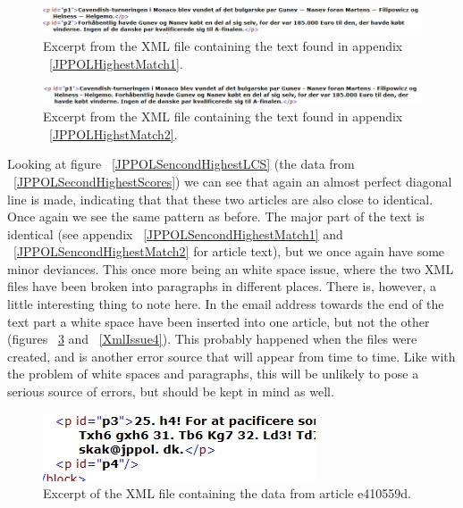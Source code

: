 \begin{figure}
 	\centering
 	\includegraphics[scale=0.5]{figures/XmlIssue1}
 	\caption{Excerpt from the XML file containing the text found in appendix ~\ref{JPPOLHighestMatch1}.}
 	\label{XmlIssue1}
\end{figure}

\begin{figure}
	\centering
	\includegraphics[scale=0.5]{figures/XmlIssue2}
	\caption{Excerpt from the XML file containing the text found in appendix ~\ref{JPPOLHighstMatch2}.}
	\label{XmlIssue2}
\end{figure}

Looking at figure ~\ref{JPPOLSencondHighestLCS} (the data from ~\ref{JPPOLSecondHighestScores}) we can see that again an almost perfect diagonal line is made, indicating that that these two articles are also close to identical. Once again we see the same pattern as before. The major part of the text is identical (see appendix ~\ref{JPPOLSencondHighestMatch1} and ~\ref{JPPOLSencondHighestMatch2} for article text), but we once again have some minor deviances. This once more being an white space issue, where the two XML files have been broken into paragraphs in different places. There is, however, a little interesting thing to note here. In the email address towards the end of the text part a white space have been inserted into one article, but not the other (figures ~\ref{XmlIssue3} and ~\ref{XmlIssue4}). This probably happened when the files were created, and is another error source that will appear from time to time. Like with the problem of white spaces and paragraphs, this will be unlikely to pose a serious source of errors, but should be kept in mind as well.

\begin{figure}
	\centering
	\includegraphics[scale=1.0]{figures/XmlIssue3}
	\caption{Excerpt of the XML file containing the data from article e410559d.}
	\label{XmlIssue3}
\end{figure}

